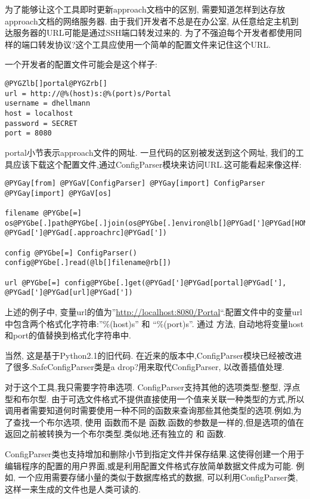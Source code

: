 \documentclass[a4paper,10pt,english]{manual}
\begin{document}
为了能够让这个工具即时更新approach文档中的区别, 需要知道怎样到达存放approach文档的网络服务器. 由于我们开发者不总是在办公室, 从任意给定主机到达服务器的URL可能是通过SSH端口转发过来的. 为了不强迫每个开发者都使用同样的端口转发协议?这个工具应使用一个简单的配置文件来记住这个URL.

一个开发者的配置文件可能会是这个样子:

\begin{Verbatim}[commandchars=@\[\]]
@PYGZlb[]portal@PYGZrb[]
url = http://@%(host)s:@%(port)s/Portal
username = dhellmann
host = localhost
password = SECRET
port = 8080
\end{Verbatim}

portal小节表示approach文件的网址. 一旦代码的区别被发送到这个网址, 我们的工具应该下载这个配置文件,通过ConfigParser模块来访问URL.这可能看起来像这样:

\begin{Verbatim}[commandchars=@\[\]]
@PYGay[from] @PYGaV[ConfigParser] @PYGay[import] ConfigParser
@PYGay[import] @PYGaV[os]

filename @PYGbe[=] os@PYGbe[.]path@PYGbe[.]join(os@PYGbe[.]environ@lb[]@PYGad[']@PYGad[HOME]@PYGad[']@rb[], @PYGad[']@PYGad[.approachrc]@PYGad['])

config @PYGbe[=] ConfigParser()
config@PYGbe[.]read(@lb[]filename@rb[])

url @PYGbe[=] config@PYGbe[.]get(@PYGad[']@PYGad[portal]@PYGad['], @PYGad[']@PYGad[url]@PYGad['])
\end{Verbatim}

上述的例子中, 变量url的值为''\href{http://localhost:8080/Portal}{http://localhost:8080/Portal}``.配置文件中的变量url中包含两个格式化字符串:''\%(host)s'' 和 ``\%(port)s''. 通过  方法, 自动地将变量host和port的值替换到格式化字符串中.

当然, 这是基于Python2.1的旧代码. 在近来的版本中,ConfigParser模块已经被改进了很多.SafeConfigParser类是a drop?用来取代ConfigParser, 以改善插值处理.

对于这个工具,我只需要字符串选项. ConfigParser支持其他的选项类型:整型, 浮点型和布尔型. 由于可选文件格式不提供直接使用一个值来关联一种类型的方式,所以调用者需要知道何时需要使用一种不同的函数来查询那些其他类型的选项.例如,为了查找一个布尔选项, 使用  函数而不是  函数.函数的参数是一样的,但是选项的值在返回之前被转换为一个布尔类型.类似地,还有独立的  和  函数.

ConfigParser类也支持增加和删除小节到指定文件并保存结果.这使得创建一个用于编辑程序的配置的用户界面,或是利用配置文件格式存放简单数据文件成为可能. 例如, 一个应用需要存储小量的类似于数据库格式的数据, 可以利用ConfigParser类,这样一来生成的文件也是人类可读的.
\end{document}
